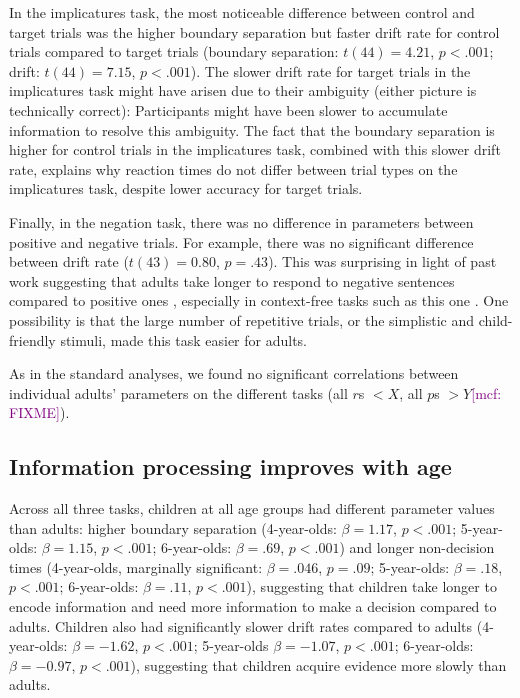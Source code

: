 \documentclass[10pt,letterpaper]{article}
\newcommand{\mcf}[1]{\textcolor{Purple}{[mcf: #1]}}
\begin{document}
In the implicatures task, the most noticeable difference between control and target trials was the higher boundary separation but faster drift rate for control trials compared to target trials (boundary separation: $t(44) = 4.21$, $p< .001$; drift: $t(44) = 7.15$, $p< .001$). The slower drift rate for target trials in the implicatures task might have arisen due to their ambiguity (either picture is technically correct): Participants might have been slower to accumulate information to resolve this ambiguity. The fact that the boundary separation is higher for control trials in the implicatures task, combined with this slower drift rate, explains why reaction times do not differ between trial types on the implicatures task, despite lower accuracy for target trials.

Finally, in the negation task, there was no difference in parameters between positive and negative trials. For example, there was no significant difference between drift rate ($t(43) = 0.80$, $p = .43$). This was surprising in light of past work suggesting that adults take longer to respond to negative sentences compared to positive ones \cite{hclark1972}, especially in context-free tasks such as this one \cite{nordmeyer2014a}. One possibility is that the large number of repetitive trials, or the simplistic and child-friendly stimuli, made this task easier for adults.

As in the standard analyses, we found no significant correlations between individual adults' parameters on the different tasks (all $r$s $< X$, all $p$s $> Y$\mcf{FIXME}).




\subsection{Information processing improves with age}


Across all three tasks, children at all age groups had different parameter values than adults: higher boundary separation (4-year-olds: $\beta = 1.17$, $p <.001$; 5-year-olds: $\beta = 1.15$, $p <.001$; 6-year-olds: $\beta = .69$, $p <.001$) and longer non-decision times (4-year-olds, marginally significant: $\beta = .046$, $p = .09$; 5-year-olds: $\beta = .18$, $p <.001$; 6-year-olds: $\beta = .11$, $p <.001$), suggesting that children take longer to encode information and need more information to make a decision compared to adults. Children also had significantly slower drift rates compared to adults
(4-year-olds: $\beta = -1.62$, $p <.001$; 5-year-olds $\beta = -1.07$, $p <.001$; 6-year-olds: $\beta = -0.97$, $p <.001$), suggesting that children acquire evidence more slowly than adults.
\end{document}
